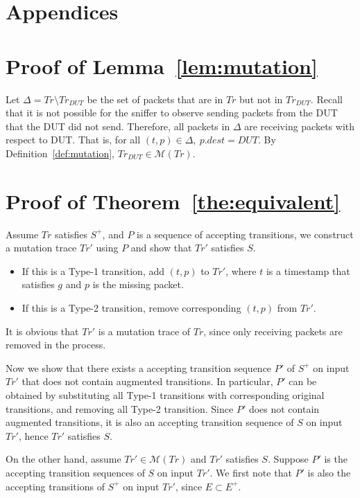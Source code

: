 \section*{Appendices}
\appendix

\section{Proof of Lemma~\ref{lem:mutation}}
\label{app:lemma1}
Let $\Delta = Tr \setminus Tr_{DUT}$ be the set of packets that are in $Tr$
but not in $Tr_{DUT}$. Recall that it is not possible for the sniffer to
observe sending packets from the DUT that the DUT did not send. Therefore,
all packets in $\Delta$ are receiving packets with respect to DUT. That is, for
all $(t, p) \in \Delta,\ p.dest = DUT$. By Definition~\ref{def:mutation},
$Tr_{DUT} \in \mathcal{M}(Tr)$.



\section{Proof of Theorem~\ref{the:equivalent}}
\label{app:theorem1}
Assume $Tr$ satisfies $S^+$, and $P$ is a sequence of accepting transitions,
we construct a mutation trace $Tr'$ using $P$ and show that $Tr'$ satisfies
$S$.

\begin{itemize}
  \item If this is a Type-1 transition, add $(t, p)$ to $Tr'$, where $t$ is a
    timestamp that satisfies $g$ and $p$ is the missing packet.
  \item If this is a Type-2 transition, remove corresponding $(t, p)$ from
    $Tr'$.
\end{itemize}
It is obvious that $Tr'$ is a mutation trace of $Tr$, since only receiving
packets are removed in the process.

Now we show that there exists a accepting transition sequence $P'$ of $S^+$ on
input $Tr'$ that does not contain augmented transitions.  In particular, $P'$
can be obtained by substituting all Type-1 transitions with corresponding
original transitions, and removing all Type-2 transition.  Since $P'$ does not
contain augmented transitions, it is also an accepting transition sequence of
$S$ on input $Tr'$, hence $Tr'$ satisfies $S$.

On the other hand, assume $Tr' \in \mathcal{M}(Tr)$ and $Tr'$ satisfies $S$.
Suppose $P'$ is the accepting transition sequences of $S$ on input $Tr'$.
We first note that $P'$ is also the accepting transitions of $S^+$ on input
$Tr'$, since $E \subset E^+$.

